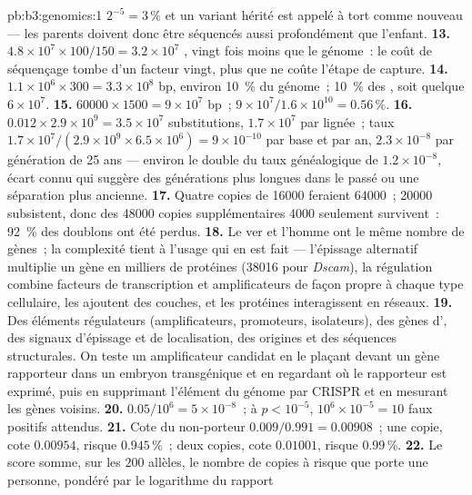 \begin{solution}{pb:b3:genomics:1}
$2^{-5} = 3\,\%$ et un variant hérité est appelé à tort comme nouveau
--- les parents doivent donc être séquencés aussi profondément que
l'enfant.
\textbf{13.} $4.8\times 10^{7}\times 100/150 = 3.2\times 10^{7}$
, vingt fois moins que le génome~: le coût de séquençage tombe
d'un facteur vingt, plus que ne coûte l'étape de capture.
\textbf{14.} $1.1\times 10^{6}\times 300 = 3.3\times 10^{8}$ bp, environ
\qty{10}{\%} du génome~; \qty{10}{\%} des , soit quelque $6\times
10^{7}$.
\textbf{15.} $\num{60000}\times 1500 = 9\times 10^{7}$ bp~; $9\times
10^{7}/1.6\times 10^{10} = 0.56\,\%$.
\textbf{16.} $0.012\times 2.9\times 10^{9} = 3.5\times 10^{7}$
substitutions, $1.7\times 10^{7}$ par lignée~; taux $1.7\times
10^{7}/(2.9\times 10^{9}\times 6.5\times 10^{6}) = 9\times 10^{-10}$
par base et par an, $2.3\times 10^{-8}$ par génération de 25 ans ---
environ le double du taux généalogique de $1.2\times 10^{-8}$, écart
connu qui suggère des générations plus longues dans le passé ou une
séparation plus ancienne.
\textbf{17.} Quatre copies de \num{16000} feraient \num{64000}~;
\num{20000} subsistent, donc des \num{48000} copies supplémentaires
\num{4000} seulement survivent~: \qty{92}{\%} des doublons ont été
perdus.
\textbf{18.} Le ver et l'homme ont le même nombre de gènes~; la
complexité tient à l'usage qui en est fait --- l'épissage alternatif
multiplie un gène en milliers de protéines (\num{38016} pour
\emph{Dscam}), la régulation combine facteurs de transcription et
amplificateurs de façon propre à chaque type cellulaire, les  ajoutent des couches, et les protéines interagissent en réseaux.
\textbf{19.} Des éléments régulateurs (amplificateurs, promoteurs,
isolateurs), des gènes d', des signaux d'épissage et de
localisation, des origines et des séquences structurales. On teste un
amplificateur candidat en le plaçant devant un gène rapporteur dans un
embryon transgénique et en regardant où le rapporteur est exprimé, puis
en supprimant l'élément du génome par CRISPR et en mesurant les gènes
voisins.
\textbf{20.} $0.05/10^{6} = 5\times 10^{-8}$~; à $p < 10^{-5}$, $10^{6}
\times 10^{-5} = 10$ faux positifs attendus.
\textbf{21.} Cote du non-porteur $0.009/0.991 = 0.00908$~; une copie,
cote $0.00954$, risque $0.945\,\%$~; deux copies, cote $0.01001$, risque
$0.99\,\%$.
\textbf{22.} Le score somme, sur les $200$ allèles, le nombre de copies
à risque que porte une personne, pondéré par le logarithme du rapport

\end{solution}
